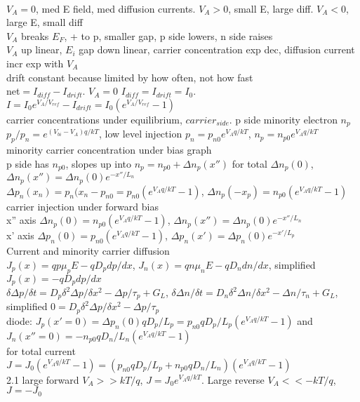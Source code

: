 \documentclass{article}
\begin{document}
\begin{large}
\\$V_A=0$, med E field, med diffusion currents. $V_A>0$, small E, large diff. $V_A<0$, large E, small diff
\\$V_A$ breaks $E_F$, + to p, smaller gap, p side lowers, n side raises
\\$V_A$ up linear, $E_i$ gap down linear, carrier concentration exp dec, diffusion current incr exp with $V_A$
\\drift constant because limited by how often, not how fast
\\net$=I_{diff}-I_{drift}$. $V_A=0$ $I_{diff}=I_{drift}=I_0$. $I=I_0e^{V_A/V_{ref}}-I_{drift}=I_0(e^{V_A/V_{ref}}-1)$
\\carrier concentrations under equilibrium, $carrier_{side}$. p side minority electron $n_p$
\\$p_p/p_n=e^{(V_{bi}-V_A) q/kT}$, low level injection $p_n=p_{n0}e^{V_A q/kT}$, $n_p=n_{p0}e^{V_A q/kT}$
\\minority carrier concentration under bias graph
\\p side has $n_{p0}$, slopes up into $n_p=n_{p0}+\Delta n_p(x'')$ for total $\Delta n_p(0)$, $\Delta n_p(x'')=\Delta n_p(0)e^{-x''/L_n}$
\\$\Delta p_n(x_n)=p_n(x_n-p_{n0}=p_{n0}(e^{V_A q/kT}-1)$, $\Delta n_p(-x_p)=n_{p0}(e^{V_A q/kT}-1)$
\\carrier injection under forward bias
\\x'' axis $\Delta n_p(0)=n_{p0}(e^{V_A q/kT}-1)$, $\Delta n_p(x'')=\Delta n_p(0) e^{-x''/L_n}$
\\x' axis $\Delta p_n(0)=p_{n0}(e^{V_A q/kT}-1)$, $\Delta p_n(x')=\Delta p_n(0) e^{-x'/L_p}$
\\Current and minority carrier diffusion
\\$J_p(x)=qp\mu_pE-qD_p dp/dx$, $J_n(x)=qn\mu_nE-qD_n dn/dx$, simplified $J_p(x)=-qD_p dp/dx$
\\$\delta\Delta p/\delta t=D_p \delta^2\Delta p/\delta x^2 - \Delta p/\tau_p+G_L$, $\delta\Delta n/\delta t=D_n \delta^2\Delta n/\delta x^2 - \Delta n/\tau_n+G_L$, simplified $0=D_p \delta^2\Delta p/\delta x^2 - \Delta p/\tau_p$
\\diode: $J_p(x'=0)=\Delta p_n(0) q D_p/L_p=p_{n0} q D_p/L_p (e^{V_A q/kT}-1)$ and $J_n(x''=0)=-n_{p0} q D_n/L_n (e^{V_A q/kT}-1)$
\\for total current $J=J_0 (e^{V_A q/kT}-1) = (p_{n0} q D_p/L_p+n_{p0} q D_n/L_n)(e^{V_A q/kT}-1)$
\\2.1 large forward $V_A>>kT/q$, $J=J_0 e^{V_A q/kT}$. Large reverse $V_A<<-kT/q$, $J=-J_0$

\end{large}
\end{document}
